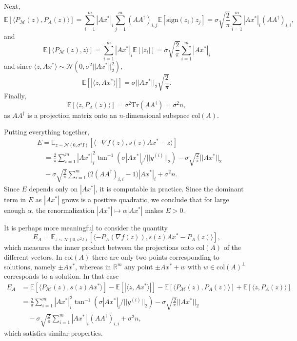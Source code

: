 \documentclass[journal]{IEEEtran}
\theoremstyle{definition}
\theoremstyle{remark}
\theoremstyle{definition}
\theoremstyle{problem}
\theoremstyle{definition}
\newcommand{\Tr}{\text{Tr}}
\newcommand{\col}{\text{col}}
\newcommand{\sign}{\text{sign}}
\newcommand{\atan}{\tan^{-1}}
\newcommand{\RR}{\mathbb{R} }
\newcommand{\MM}{\mathcal{M}}
\newcommand{\EE}{\mathbb{E}}
\begin{document}
Next,
\[ \EE[\langle P_{\MM}(z), P_A(z)\rangle] = \sum_{i=1}^m|Ax^*|_i\sum_{j=1}^m(AA^{\dagger})_{i,j}\EE[\sign(z_i)z_j] = \sigma\sqrt{\frac{2}{\pi}}\sum_{i=1}^m|Ax^*|_i(AA^{\dagger})_{i,i},\]
and
\[\EE\left[\langle P_{\MM}(z),z\rangle\right] = \sum_{i=1}^m|Ax^*|_i\EE[|z_i|] = \sigma\sqrt{\frac{2}{\pi}}\sum_{i=1}^m|Ax^*|_i\]
and since $\langle z,Ax^*\rangle\sim\mathcal{N}(0, \sigma^2||Ax^*||_2^2)$,
\[\EE[|\langle z,Ax^*\rangle|] = \sigma||Ax^*||_2\sqrt{\frac{2}{\pi}}.\]
Finally,
\[\EE[\langle z, P_A(z)\rangle] = \sigma^2\Tr(AA^{\dagger}) = \sigma^2n,\]
as $AA^{\dagger}$ is a projection matrix onto an $n$-dimensional subspace $\col(A)$.

Putting everything together,
\[\begin{aligned}&E=\EE_{z\sim \mathcal{N}(0,\sigma^2I)}\left[\langle -\nabla f(z), s(z)Ax^*-z\rangle\right]\\
&\quad= \frac{2}{\pi}\sum_{i=1}^m|Ax^*|_i^2\atan(\sigma|Ax^*|_i/||y^{(i)}||_2) - \sigma\sqrt{\frac{2}{\pi}}||Ax^*||_2\\
&\quad- \sigma\sqrt{\frac{2}{\pi}}\sum_{i=1}^m\Big(2(AA^{\dagger})_{i,i}-1\Big)|Ax^*|_i + \sigma^2n.\end{aligned}\]
Since $E$ depends only on $|Ax^*|$, it is computable in practice. Since the dominant term in $E$ as $|Ax^*|$ grows is a positive quadratic, we conclude that for large enough $\alpha$, the renormalization $|Ax^*|\mapsto \alpha|Ax^*|$ makes $E>0$.

It is perhaps more meaningful to consider the quantity
\[E_A = \EE_{z\sim \mathcal{N}(0,\sigma^2I)}\left[\langle -P_A(\nabla f(z)), s(z)Ax^*-P_A(z)\rangle\right],\]
which measures the inner product between the projections onto $\col(A)$ of the different vectors. In $\col(A)$ there are only two points corresponding to solutions, namely $\pm Ax^*$, whereas in $\RR^m$ any point $\pm Ax^* + w$ with $w\in\col(A)^{\perp}$ corresponds to a solution. In that case
\[\begin{aligned} E_A &= \EE[\langle P_{\MM}(z), s(z)Ax^*\rangle] - \EE[|\langle z,Ax^*\rangle|] - \EE[\langle P_{\MM}(z), P_A(z)\rangle] + \EE[\langle z,P_A(z)\rangle]\\
&= \frac{2}{\pi}\sum_{i=1}^m|Ax^*|_i^2\atan(\sigma|Ax^*|_i/||y^{(i)}||_2) - \sigma\sqrt{\frac{2}{\pi}}||Ax^*||_2\\
&\quad- \sigma\sqrt{\frac{2}{\pi}}\sum_{i=1}^m|Ax^*|_i(AA^{\dagger})_{i,i} + \sigma^2n,\end{aligned}\]
which satisfies similar properties.
\end{document}
